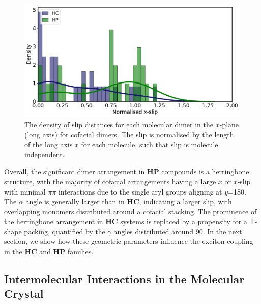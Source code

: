 \begin{figure}[t]
\centering
  \includegraphics[width=0.8\linewidth]{5ConnectingCrystalStructure/xslip_density}
  \caption[$x$-slip densities for dimer configurations of \textbf{HC} and \textbf{HP} systems]{The density of slip distances for each molecular dimer in the $x$-plane (long axis) for cofacial dimers. The slip is normalised by the length of the long axis $x$ for each molecule, such that slip is molecule independent.}
  \label{figure: xslip_density}
\end{figure}

Overall, the significant dimer arrangement in \textbf{HP} compounds is a herringbone structure, with the majority of cofacial arrangements having a large $x$ or $x$-slip with minimal $\pi\pi$ interactions due to the single aryl groups aligning at $y$=180\degree. The $\alpha$ angle is generally larger than in \textbf{HC}, indicating a larger slip, with overlapping monomers distributed around a cofacial stacking. The prominence of the herringbone arrangement in \textbf{HC} systems is replaced by a propensity for a T-shape packing, quantified by the $\gamma$ angles distributed around 90\degree. In the next section, we show how these geometric parameters influence the exciton coupling in the \textbf{HC} and \textbf{HP} families.

\subsection{Intermolecular Interactions in the Molecular Crystal}\label{section: Connecting_Interactions}

